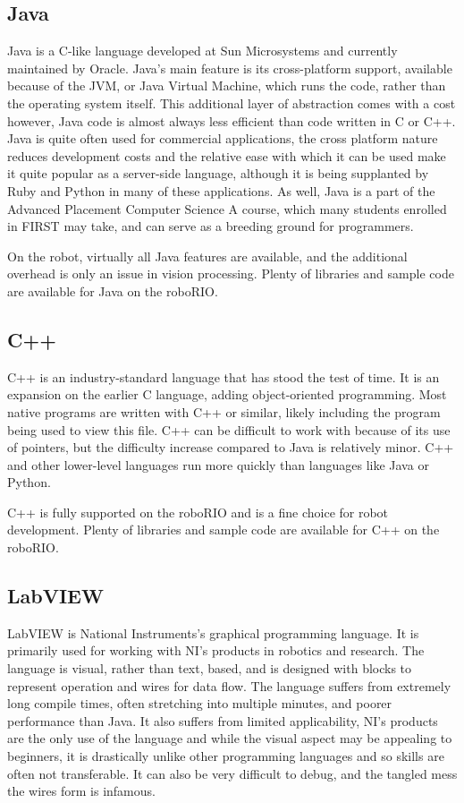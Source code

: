 \documentclass[]{report}
\begin{document}
\subsection{Java}
Java is a C-like language developed at Sun Microsystems and currently maintained by Oracle.
Java's main feature is its cross-platform support, available because of the JVM, or Java Virtual Machine, which runs the code, rather than the operating system itself.
This additional layer of abstraction comes with a cost however, Java code is almost always less efficient than code written in C or C++.
Java is quite often used for commercial applications, the cross platform nature reduces development costs and the relative ease with which it can be used make it quite popular as a server-side language, although it is being supplanted by Ruby and Python in many of these applications.
As well, Java is a part of the Advanced Placement Computer Science A course, which many students enrolled in FIRST may take, and can serve as a breeding ground for programmers.

On the robot, virtually all Java features are available, and the additional overhead is only an issue in vision processing.
Plenty of libraries and sample code are available for Java on the roboRIO.

\subsection{C++}
C++ is an industry-standard language that has stood the test of time.
It is an expansion on the earlier C language, adding object-oriented programming.
Most native programs are written with C++ or similar, likely including the program being used to view this file.
C++ can be difficult to work with because of its use of pointers, but the difficulty increase compared to Java is relatively minor.
C++ and other lower-level languages run more quickly than languages like Java or Python.

C++ is fully supported on the roboRIO and is a fine choice for robot development.
Plenty of libraries and sample code are available for C++ on the roboRIO.

\subsection{LabVIEW}
LabVIEW is National Instruments's graphical programming language.
It is primarily used for working with NI's products in robotics and research.
The language is visual, rather than text, based, and is designed with blocks to represent operation and wires for data flow.
The language suffers from extremely long compile times, often stretching into multiple minutes, and poorer performance than Java.
It also suffers from limited applicability, NI's products are the only use of the language and while the visual aspect may be appealing to beginners, it is drastically unlike other programming languages and so skills are often not transferable.
It can also be very difficult to debug, and the tangled mess the wires form is infamous.
\end{document}
